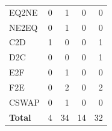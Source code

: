 \begin{tabular}{lrrrr}
            EQ2NE & 0 & 1 & 0 & 0 \\
            NE2EQ & 0 & 1 & 0 & 0 \\
    \midrule
            C2D & 1 & 0 & 0 & 1 \\
            D2C & 0 & 0 & 0 & 1 \\
    \midrule
            E2F & 0 & 1 & 0 & 0 \\
            F2E & 0 & 2 & 0 & 2 \\
    \midrule
            CSWAP & 0 & 1 & 0 & 0 \\
    \midrule
    \textbf{Total} & 4 & 34 & 14 & 32 \\
    \bottomrule
\end{tabular}
